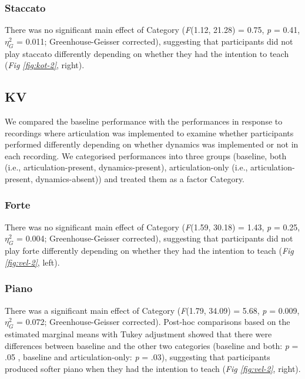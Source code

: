 \documentclass[
  man,floatsintext]{apa6}
\begin{document}
\hypertarget{staccato-1}{%
\subsubsection{Staccato}\label{staccato-1}}

There was no significant main effect of Category (\emph{F}(1.12, 21.28) = 0.75, \emph{p} = 0.41, \(\eta_G^2\) = 0.011; Greenhouse-Geisser corrected), suggesting that participants did not play staccato differently depending on whether they had the intention to teach (\emph{Fig \ref{fig:kot-2}}, right).

\hypertarget{kv-1}{%
\subsection{KV}\label{kv-1}}

We compared the baseline performance with the performances in response to recordings where articulation was implemented to examine whether participants performed differently depending on whether dynamics was implemented or not in each recording. We categorised performances into three groups (baseline, both (i.e., articulation-present, dynamics-present), articulation-only (i.e., articulation-present, dynamics-absent)) and treated them as a factor Category.

\hypertarget{forte-1}{%
\subsubsection{Forte}\label{forte-1}}

There was no significant main effect of Category (\emph{F}(1.59, 30.18) = 1.43, \emph{p} = 0.25, \(\eta_G^2\) = 0.004; Greenhouse-Geisser corrected), suggesting that participants did not play forte differently depending on whether they had the intention to teach (\emph{Fig \ref{fig:vel-2}}, left).

\hypertarget{piano-1}{%
\subsubsection{Piano}\label{piano-1}}

There was a significant main effect of Category (\emph{F}(1.79, 34.09) = 5.68, \emph{p} = 0.009, \(\eta_G^2\) = 0.072; Greenhouse-Geisser corrected). Post-hoc comparisons based on the estimated marginal means with Tukey adjustment showed that there were differences between baseline and the other two categories (baseline and both: \emph{p} = .05 , baseline and articulation-only: \emph{p} = .03), suggesting that participants produced softer piano when they had the intention to teach (\emph{Fig \ref{fig:vel-2}}, right).
\end{document}
